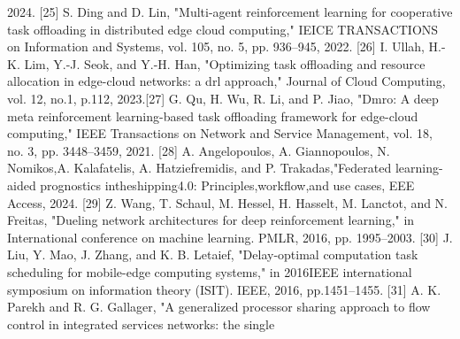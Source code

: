 \documentclass{article}
\begin{document}
2024.
[25] S. Ding and D. Lin, "Multi-agent reinforcement learning for cooperative task offloading in distributed edge cloud computing," IEICE TRANSACTIONS on Information and Systems, vol. 105, no. 5, pp.
936–945, 2022.
[26] I. Ullah, H.-K. Lim, Y.-J. Seok, and Y.-H. Han, "Optimizing task offloading and resource allocation in edge-cloud networks: a drl approach," Journal of Cloud Computing, vol. 12, no.1, p.112, 2023.[27] G. Qu, H. Wu, R. Li, and P. Jiao, "Dmro: A deep meta reinforcement learning-based task offloading framework for edge-cloud computing,"
IEEE Transactions on Network and Service Management, vol. 18,
no. 3, pp. 3448–3459, 2021.
[28] A. Angelopoulos, A. Giannopoulos, N. Nomikos,A. Kalafatelis,
A. Hatziefremidis, and P. Trakadas,"Federated learning-aided prognostics intheshipping4.0: Principles,workflow,and use cases, EEE Access, 2024.
[29] Z. Wang, T. Schaul, M. Hessel, H. Hasselt, M. Lanctot, and N. Freitas,
"Dueling network architectures for deep reinforcement learning," in International conference on machine learning. PMLR, 2016, pp.
1995–2003.
[30] J. Liu, Y. Mao, J. Zhang, and K. B. Letaief, "Delay-optimal computation task scheduling for mobile-edge computing systems," in 2016IEEE international symposium on information theory (ISIT). IEEE,
2016, pp.1451–1455.
[31] A. K. Parekh and R. G. Gallager, "A generalized processor sharing approach to flow control in integrated services networks: the single
\end{document}
